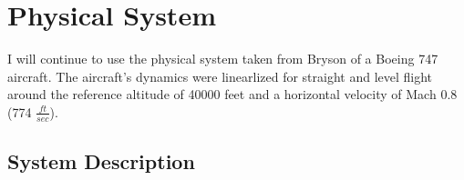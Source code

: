 \section{Physical System} \label{sec:physys}


I will continue to use the physical system taken from Bryson
\cite{bryson2015control} of a Boeing 747 aircraft. The aircraft's
dynamics were linearlized for straight and level flight around the
reference altitude of 40000 feet and a horizontal velocity of Mach 0.8 (774
$\frac{ft}{sec}$). 


\subsection{System Description}

